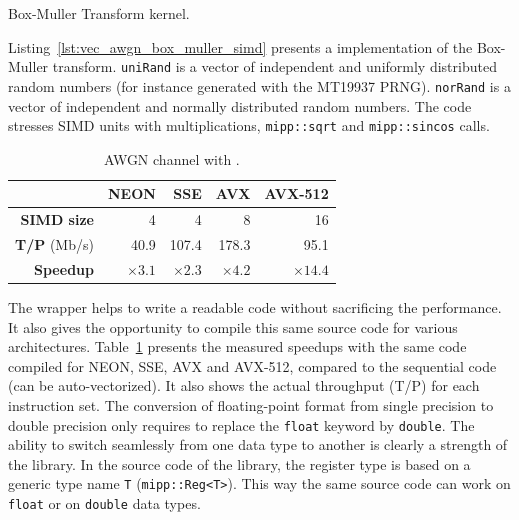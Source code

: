 \begin{listing}[htp]
  \inputminted[frame=lines,linenos]{C++}{main/chapter3/src/awgn/box_muller_simd.cpp}
  \caption{Box-Muller Transform \MIPP kernel.}
  \label{lst:vec_awgn_box_muller_simd}
\end{listing}

Listing~\ref{lst:vec_awgn_box_muller_simd} presents a \MIPP implementation of
the Box-Muller transform. \verb|uniRand| is a vector of independent and
uniformly distributed random numbers (for instance generated with the MT19937
PRNG). \verb|norRand| is a vector of independent and normally distributed random
numbers. The code stresses SIMD units with multiplications, \verb|mipp::sqrt|
and \verb|mipp::sincos| calls.

\begin{table}[htp]
  \centering
  \caption{AWGN channel with \MIPP.}
  \label{tab:vec_awgn_speedup}
  \begin{tabular}{r | r  r r r}
                      & \textbf{NEON} & \textbf{SSE} & \textbf{AVX} & \textbf{AVX-512} \\ \hline \hline
  \textbf{SIMD size}  & 4             & 4            & 8            & 16               \\ %
  \textbf{T/P} (Mb/s) & 40.9          & 107.4        & 178.3        & 95.1             \\ %
  \textbf{Speedup}    & $\times 3.1$  & $\times 2.3$ & $\times 4.2$ & $\times 14.4$    \\
  \end{tabular}
\end{table}

The \MIPP wrapper helps to write a readable code without sacrificing the
performance. It also gives the opportunity to compile this same source code for
various architectures. Table~\ref{tab:vec_awgn_speedup} presents the measured
speedups with the same \MIPP code compiled for NEON, SSE, AVX and AVX-512,
compared to the sequential code (can be auto-vectorized). It also shows the
actual throughput (T/P) for each instruction set. The conversion of
floating-point format from single precision to double precision only requires to
replace the \verb|float| keyword by \verb|double|. The ability to switch
seamlessly from one data type to another is clearly a strength of the \MIPP
library. In the source code of the \AFFECT library, the register type is based
on a generic type name \verb|T| (\verb|mipp::Reg<T>|). This way the same source
code can work on \verb|float| or on \verb|double| data types.


